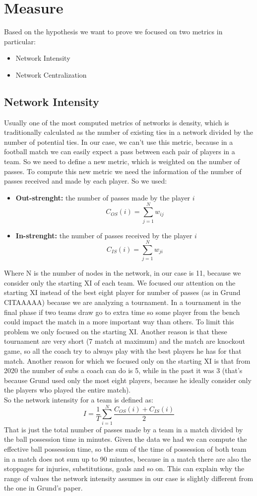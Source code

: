 \documentclass[12pt, a4paper]{article}
\begin{document}
\section{Measure}
\label{measures}
Based on the hypothesis we want to prove we focused on two metrics in particular:
\begin{itemize}
        \item Network Intensity
        \item Network Centralization
\end{itemize}
\subsection{Network Intensity}
Usually one of the most computed metrics of networks is density, which
is traditionally calculated as the number of existing ties in a network divided by the number of potential ties. In our case, we can't use this metric, because in a football match we can easily expect a pass between each pair of players in a team. So we need to define a new metric, which is weighted on the number of passes. To compute this new metric we need the information of the number of passes received and made by each player. So we used: 
\begin{itemize}
        \item \textbf{Out-strenght:} the number of passes made by the player $i$
        $$ C_{OS}(i) = \sum^{N}_{j=1}w_{ij}$$
        \item \textbf{In-strenght:} the number of passes received by the player $i$
         $$C_{IS}(i) = \sum^{N}_{j=1}w_{ji}$$
\end{itemize}
Where N is the number of nodes in the network, in our case is 11, because we consider only the starting XI of each team. We focused our attention on the starting XI instead of the best eight player for number of passes (as in Grund CITAAAAA) because we are analyzing a tournament. In a tournament in the final phase if two teams draw go to extra time so some player from the bench could impact the match in a more important way than others. To limit this problem we only focused on the starting XI. Another reason is that these tournament are very short (7 match at maximum) and the match are knockout game, so all the coach try to always play with the best players he has for that match. Another reason for which we focused only on the starting XI is that from 2020 the number of subs a coach can do is 5, while in the past it was 3 (that's because Grund used only the most eight players, because he ideally consider only the players who played the entire match). \\
So the network intensity for a team is defined as:
$$I = \frac{1}{T}\sum^N_{i=1} \frac{ C_{OS}(i) +  C_{IS}(i)}{2}$$
That is just the total number of passes made by a team in a match divided by the ball possession time in minutes. Given the data we had we can compute the effective ball possession time, so the sum of the time of possession of both team in a match does not sum up to 90 minutes, because in a match there are also the stoppages for injuries, substitutions, goals and so on. This can explain why the range of values the network intensity assumes in our case is slightly different from the one in Grund's paper.
\\
\end{document}
